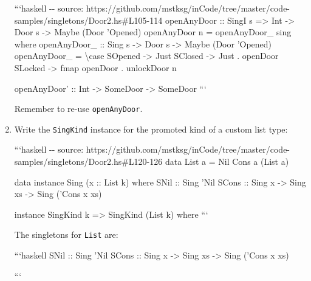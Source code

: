 \documentclass[]{article}
\begin{document}
\begin{enumerate}
  ```haskell -\/- source:
  https://github.com/mstksg/inCode/tree/master/code-samples/singletons/Door2.hs\#L105-114
  openAnyDoor :: SingI s =\textgreater{} Int -\textgreater{} Door s
  -\textgreater{} Maybe (Door 'Opened) openAnyDoor n = openAnyDoor\_ sing where
  openAnyDoor\_ :: Sing s -\textgreater{} Door s -\textgreater{} Maybe (Door
  'Opened) openAnyDoor\_ = \textbackslash{}case SOpened -\textgreater{} Just
  SClosed -\textgreater{} Just . openDoor SLocked -\textgreater{} fmap openDoor
  . unlockDoor n

  openAnyDoor' :: Int -\textgreater{} SomeDoor -\textgreater{} SomeDoor ```

  Remember to re-use \texttt{openAnyDoor}.
\item
  Write the \texttt{SingKind} instance for the promoted kind of a custom list
  type:

  ```haskell -\/- source:
  https://github.com/mstksg/inCode/tree/master/code-samples/singletons/Door2.hs\#L120-126
  data List a = Nil \textbar{} Cons a (List a)

  data instance Sing (x :: List k) where SNil :: Sing 'Nil SCons :: Sing x
  -\textgreater{} Sing xs -\textgreater{} Sing ('Cons x xs)

  instance SingKind k =\textgreater{} SingKind (List k) where ```

  The singletons for \texttt{List} are:

  ```haskell SNil :: Sing 'Nil SCons :: Sing x -\textgreater{} Sing xs
  -\textgreater{} Sing ('Cons x xs)

  ```
\end{enumerate}
\end{document}
